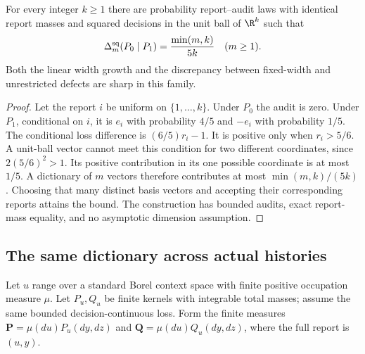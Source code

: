 \begin{theorem}\label{thm:sharp-width}
For every integer $k\ge1$ there are probability report--audit laws with identical report masses and squared decisions in the unit ball of $\R^k$ such that
\begin{equation}\label{eq:sharp-width-law}
 \Delta_m^{\rm sq}(P_0\mid P_1)=\frac{\min(m,k)}{5k}
 \quad(m\ge1).
\end{equation}
Both the linear width growth and the discrepancy between fixed-width and unrestricted defects are sharp in this family.
\end{theorem}
\begin{proof}
Let the report $i$ be uniform on $\{1,\ldots,k\}$. Under $P_0$ the audit is zero. Under $P_1$, conditional on $i$, it is $e_i$ with probability $4/5$ and $-e_i$ with probability $1/5$. The conditional loss difference is $(6/5)r_i-1$. It is positive only when $r_i>5/6$. A unit-ball vector cannot meet this condition for two different coordinates, since $2(5/6)^2>1$. Its positive contribution in its one possible coordinate is at most $1/5$. A dictionary of $m$ vectors therefore contributes at most $\min(m,k)/(5k)$. Choosing that many distinct basis vectors and accepting their corresponding reports attains the bound. The construction has bounded audits, exact report-mass equality, and no asymptotic dimension assumption.
\end{proof}

\subsection{The same dictionary across actual histories}
Let $u$ range over a standard Borel context space with finite positive occupation measure $\mu$. Let $P_u,Q_u$ be finite kernels with integrable total masses; assume the same bounded decision-continuous loss. Form the finite measures $\mathbf P=\mu(du)P_u(dy,dz)$ and $\mathbf Q=\mu(du)Q_u(dy,dz)$, where the full report is $(u,y)$.

